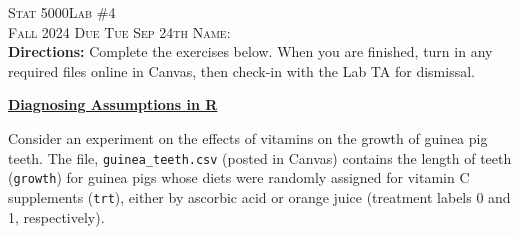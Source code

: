 \documentclass[11pt]{article}
\begin{document}
\large \noindent \textsc{Stat 5000}\hfill \large{\textsc{Lab \#4}} \hfill {} \\
\large \textsc{Fall 2024}  \hfill \textsc{Due Tue Sep 24th} \hfill \textsc{Name:} \underline{\hspace{2in}} \\


\noindent \textbf{Directions:} Complete the exercises below. When you are finished, turn in any required files online in Canvas, then check-in with the Lab TA for dismissal.
\\ \underline{\hspace{7in}}
\vspace{14pt}

\textbf{\underline{Diagnosing Assumptions in R}}

Consider an experiment on the effects of vitamins on the growth of guinea pig teeth.  The file, \texttt{guinea\_teeth.csv} (posted in Canvas) contains the length of teeth (\texttt{growth}) for guinea pigs whose diets were randomly assigned for vitamin C supplements (\texttt{trt}), either by ascorbic acid or orange juice (treatment labels 0 and 1, respectively).
\end{document}
